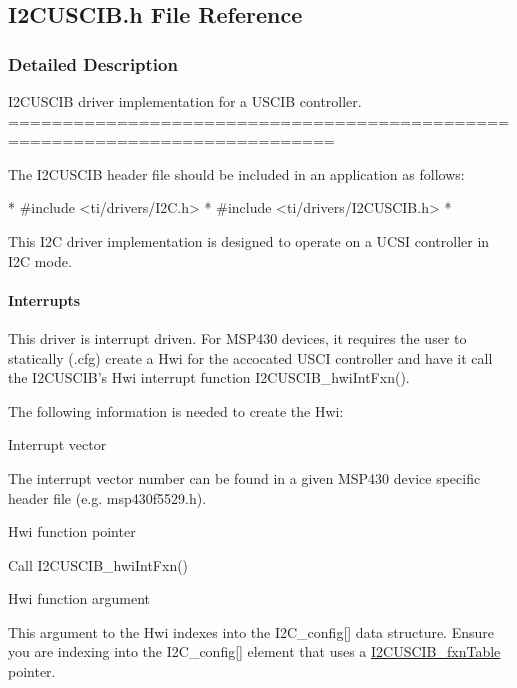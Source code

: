 \subsection{I2\-C\-U\-S\-C\-I\-B.\-h File Reference}
\label{_i2_c_u_s_c_i_b_8h}


\subsubsection{Detailed Description}
I2\-C\-U\-S\-C\-I\-B driver implementation for a U\-S\-C\-I\-B controller. ============================================================================

The I2\-C\-U\-S\-C\-I\-B header file should be included in an application as follows\-: 
\begin{DoxyCode}
*  #include <ti/drivers/I2C.h>
*  #include <ti/drivers/I2CUSCIB.h>
*  
\end{DoxyCode}


This I2\-C driver implementation is designed to operate on a U\-C\-S\-I controller in I2\-C mode.

\paragraph*{Interrupts}

This driver is interrupt driven. For M\-S\-P430 devices, it requires the user to statically (.cfg) create a Hwi for the accocated U\-S\-C\-I controller and have it call the I2\-C\-U\-S\-C\-I\-B's Hwi interrupt function I2\-C\-U\-S\-C\-I\-B\-\_\-hwi\-Int\-Fxn().

The following information is needed to create the Hwi\-:
\begin{DoxyEnumerate}
\item Interrupt vector\par
 The interrupt vector number can be found in a given M\-S\-P430 device specific header file (e.\-g. msp430f5529.\-h).
\item Hwi function pointer\par
 Call I2\-C\-U\-S\-C\-I\-B\-\_\-hwi\-Int\-Fxn()
\item Hwi function argument\par
 This argument to the Hwi indexes into the I2\-C\-\_\-config\mbox{[}\mbox{]} data structure. Ensure you are indexing into the I2\-C\-\_\-config\mbox{[}\mbox{]} element that uses a \hyperlink{_i2_c_u_s_c_i_b_8h_a72eb489c9beee32e652431265a234cbd}{I2\-C\-U\-S\-C\-I\-B\-\_\-fxn\-Table} pointer.
\end{DoxyEnumerate}


